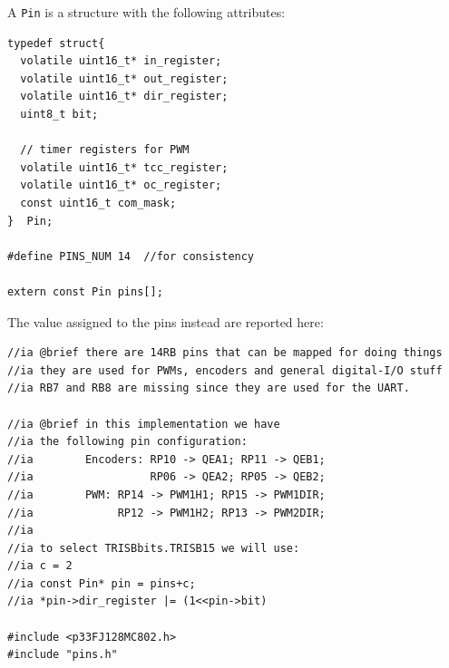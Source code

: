 \documentclass[10pt,a4paper, notitlepage]{report}
\begin{document}
A \texttt{Pin} is a structure with the following attributes:
\begin{lstlisting}[style=CStyle]
typedef struct{
  volatile uint16_t* in_register;
  volatile uint16_t* out_register;
  volatile uint16_t* dir_register;
  uint8_t bit;
  
  // timer registers for PWM
  volatile uint16_t* tcc_register;
  volatile uint16_t* oc_register;
  const uint16_t com_mask;
}  Pin;

#define PINS_NUM 14  //for consistency

extern const Pin pins[];
\end{lstlisting}

The value assigned to the pins instead are reported here:
\begin{lstlisting}[style=CStyle]
//ia @brief there are 14RB pins that can be mapped for doing things
//ia they are used for PWMs, encoders and general digital-I/O stuff
//ia RB7 and RB8 are missing since they are used for the UART.

//ia @brief in this implementation we have 
//ia the following pin configuration:
//ia        Encoders: RP10 -> QEA1; RP11 -> QEB1; 
//ia                  RP06 -> QEA2; RP05 -> QEB2; 
//ia        PWM: RP14 -> PWM1H1; RP15 -> PWM1DIR; 
//ia             RP12 -> PWM1H2; RP13 -> PWM2DIR; 
//ia
//ia to select TRISBbits.TRISB15 we will use:
//ia c = 2
//ia const Pin* pin = pins+c;
//ia *pin->dir_register |= (1<<pin->bit)

#include <p33FJ128MC802.h>
#include "pins.h"


\end{lstlisting}
\end{document}
